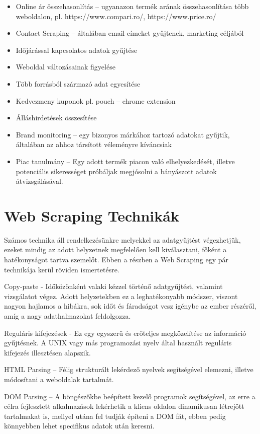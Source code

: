\begin{itemize}
    \item Online ár összehasonlítás – ugyanazon termék arának összehasonlítása több weboldalon, pl. https://www.compari.ro/, https://www.price.ro/ 
	\item Contact Scraping – általában email címeket gyűjtenek, marketing céljából
    \item Időjárással kapcsolatos adatok gyűjtése
    \item Weboldal változásainak figyelése
	\item Több forrásból származó adat egyesítése
	\item Kedvezmeny kuponok pl. pouch – chrome extension
	\item Álláshirdetések összesítése
	\item Brand monitoring – egy bizonyos márkához tartozó adatokat gyűjtik, általában az ahhoz társított véleményre kíváncsiak
    \item Piac tanulmány – Egy adott termék piacon való elhelyezkedését, illetve potenciális sikerességet próbáljak megjósolni a bányászott adatok átvizsgálásával.
\end{itemize}

\section{Web Scraping Technikák}

Számos technika áll rendelkezésünkre melyekkel az adatgyűjtést végezhetjük, ezeket mindig az adott helyzetnek megfelelően kell kiválasztani, főként a hatékonyságot tartva szemelőt. Ebben a részben a Web Scraping egy pár technikája kerül röviden ismertetésre.

Copy-paste - Időközönként valaki kézzel történő adatgyűjtést, valamint vizsgálatot végez. Adott helyzetekben ez a leghatékonyabb módszer, viszont nagyon hajlamos a hibákra, sok időt és fáradságot vesz igénybe az ember részéről, amíg a nagy adathalmazokat feldolgozza.

Reguláris kifejezések - Ez egy egyszerű és erőteljes megközelítése az információ gyűjtésnek. A UNIX vagy más programozási nyelv által használt reguláris kifejezés illesztésen alapszik.

HTML Parsing – Félig strukturált lekérdező nyelvek segítségével elemezni, illetve módosítani a weboldalak tartalmát.

DOM Parsing – A böngészőkbe beépített kezelő programok segítségével, az erre a célra fejlesztett alkalmazások lekérhetik a kliens oldalon dinamikusan létrejött tartalmakat is, mellyel utána fel tudják építeni a DOM fát, ebben pedig könnyebben lehet specifikus adatok után keresni.

